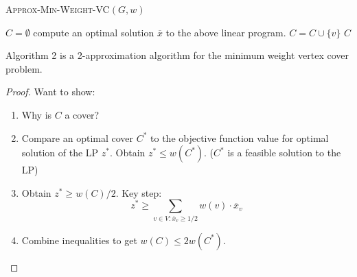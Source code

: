 \documentclass{article}
\newenvironment{theorem}[2][Theorem]{\begin{trivlist}
\item[\hskip \labelsep {\bfseries #1}\hskip \labelsep {\bfseries #2.}]}{\end{trivlist}}
\begin{document}
\begin{algorithm}
    \caption{\textsc{Approx-Min-Weight-VC}$(G, w)$}
    \begin{algorithmic}
        \State $C = \emptyset$
        \State compute an optimal solution $\overline{x}$ to the above linear program.
                \State $C = C \cup \{v\}$
            \EndIf
        \EndFor
        \State \Return $C$
    \end{algorithmic}
\end{algorithm}

\begin{theorem}{2.2}
    Algorithm 2 is a 2-approximation algorithm for the minimum weight vertex cover problem.

    \begin{proof}
        Want to show:\vspace{3pt}
        \begin{enumerate}
            \item[] Why is $C$ a cover?\vspace{3pt}
            \item[] Compare an optimal cover $C^*$ to the objective function value for optimal solution of the LP $z^*$. Obtain $z^* \leq w(C^*)$. ($C^*$ is a feasible solution to the LP)\vspace{3pt}
            \item[] Obtain $z^* \geq w(C)/2$. Key step:
                \[
                z^* \geq \sum_{v \in V: \overline{x}_v \geq 1/2} w(v) \cdot \overline{x}_v
                \]
            \item[] Combine inequalities to get $w(C) \leq 2w(C^*)$.
        \end{enumerate}
    \end{proof}
\end{theorem}


\end{document}
